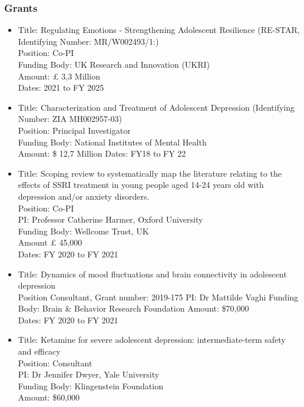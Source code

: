 \documentclass[
]{article}
\begin{document}
\hypertarget{grants}{%
\subsubsection{Grants}\label{grants}}

\begin{itemize}
\item
  Title: Regulating Emotions - Strengthening Adolescent Resilience
  (RE-STAR, Identifying Number: MR/W002493/1:)\\
  Position: Co-PI\\
  Funding Body: UK Research and Innovation (UKRI)\\
  Amount: £ 3,3 Million\\
  Dates: 2021 to FY 2025
\item
  Title: Characterization and Treatment of Adolescent Depression
  (Identifying Number: ZIA MH002957-03)\\
  Position: Principal Investigator\\
  Funding Body: National Institutes of Mental Health\\
  Amount: \$ 12,7 Million Dates: FY18 to FY 22
\item
  Title: Scoping review to systematically map the literature relating to
  the effects of SSRI treatment in young people aged 14-24 years old
  with depression and/or anxiety disorders.\\
  Position: Co-PI\\
  PI: Professor Catherine Harmer, Oxford University\\
  Funding Body: Wellcome Trust, UK\\
  Amount £ 45,000\\
  Dates: FY 2020 to FY 2021
\item
  Title: Dynamics of mood fluctuations and brain connectivity in
  adolescent depression\\
  Position Consultant, Grant number: 2019-175 PI: Dr Mattilde Vaghi
  Funding Body: Brain \& Behavior Research Foundation Amount: \$70,000\\
  Dates: FY 2020 to FY 2021
\item
  Title: Ketamine for severe adolescent depression: intermediate-term
  safety and efficacy\\
  Position: Consultant\\
  PI: Dr Jennifer Dwyer, Yale University\\
  Funding Body: Klingenstein Foundation\\
  Amount: \$60,000\\

\end{itemize}
\end{document}
